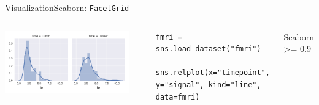 \documentclass[10pt,compress]{beamer} %
\begin{document}
\begin{frame}[fragile]{Visualization}{Seaborn: \texttt{FacetGrid}}
	\begin{columns}
		\includegraphics[width=0.9\textwidth]{figs/sns-facethist.png}\\
		\begin{exampleblock}{\footnotesize{}}
		\vspace{-0.2cm} 
		\begin{lstlisting}[basicstyle=\tiny]
		fmri = sns.load_dataset("fmri")
		sns.relplot(x="timepoint", y="signal", kind="line", data=fmri)
		\end{lstlisting}
		\vspace{-0.2cm} 
		\end{exampleblock}

		Seaborn >= 0.9


\end{columns}
\end{frame}
\end{document}
